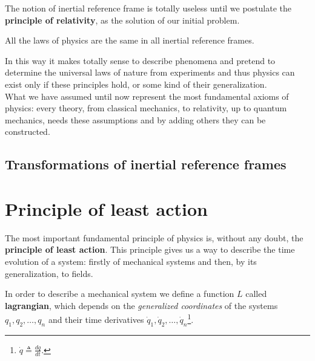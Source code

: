 The notion of inertial reference frame is totally useless until we postulate the \textbf{principle of relativity}, as the solution of our initial problem. 
\begin{principle}[of Relativity]
    All the laws of physics are the same in all inertial reference frames.
\end{principle} 
In this way it makes totally sense to describe phenomena and pretend to determine the universal laws of nature from experiments and thus physics can exist only if these principles hold, or some kind of their generalization.\\ 

What we have assumed until now represent the most fundamental axioms of physics: every theory, from classical mechanics, to relativity, up to quantum mechanics, needs these assumptions and by adding others they can be constructed.

\subsection{Transformations of inertial reference frames}

\section{Principle of least action}
The most important fundamental principle of physics is, without any doubt, the \textbf{principle of least action}. This principle gives us a way to describe the time evolution of a system: firstly of mechanical systems and then, by its generalization, to fields. 

In order to describe a mechanical system we define a function $L$ called \textbf{lagrangian}, which depends on the \emph{generalized coordinates} of the systems $q_1,q_2,\dots,q_n$ and their time derivatives $\dot q_1,\dot q_2,\dots,\dot q_n$\footnote{$\dot q\triangleq \frac{dq}{dt}$.}.

